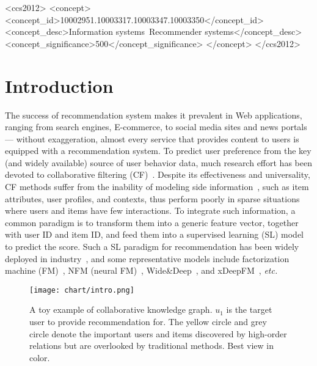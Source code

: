 \documentclass[sigconf]{acmart}
\newcommand{\etc}{\emph{etc.}}
\theoremstyle{definition}
\begin{document}
\begin{CCSXML}
	<ccs2012>
	<concept>
	<concept_id>10002951.10003317.10003347.10003350</concept_id>
	<concept_desc>Information systems~Recommender systems</concept_desc> <concept_significance>500</concept_significance>
	</concept>
	</ccs2012>
\end{CCSXML}

\maketitle

\section{Introduction}
The success of recommendation system makes it prevalent in Web applications, ranging from search engines, E-commerce, to social media sites and news portals --- without exaggeration, almost every service that provides content to users is equipped with a recommendation system. 
To predict user preference from the key (and widely available) source of user behavior data, much research effort has been devoted to collaborative filtering (CF)~\cite{NAIS,NCF,NGCF}. Despite its effectiveness and universality, CF methods suffer from the inability of modeling side information~\cite{NSCR,TEM}, such as item attributes, user profiles, and contexts, thus perform poorly in sparse situations where users and items have few interactions. 
To integrate such information, a common paradigm is to transform them into a generic feature vector, together with user ID and item ID, and feed them into a supervised learning (SL) model to predict the score. Such a SL paradigm for recommendation has been widely deployed 
in industry~\cite{DIN,DeepCrossing,WideDeep}, and some representative models include factorization machine (FM)~\cite{FM}, NFM (neural FM)~\cite{NFM}, Wide\&Deep~\cite{WideDeep}, and xDeepFM~\cite{xDeepFM}, \etc 

\begin{figure}[t]
    \centering
	\texttt{[image: chart/intro.png]}
	\vspace{-10pt}
	\caption{A toy example of collaborative knowledge graph. $u_1$ is the target user to provide recommendation for. The yellow circle and grey circle denote the important users and items discovered by high-order relations but are overlooked by traditional methods. Best view in color.
}
	\label{fig:intro}
	\vspace{-15pt}
\end{figure}
\end{document}
